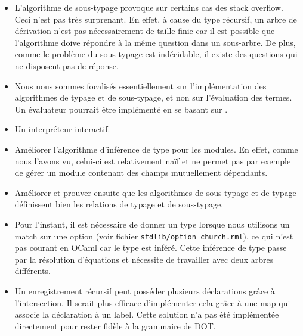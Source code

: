 \begin{itemize}
  \item L'algorithme de sous-typage provoque sur certains cas des stack
    overflow. Ceci n'est pas très surprenant. En effet, à cause
    du type récursif, un arbre de dérivation n'est pas nécessairement de taille finie car
    il est possible que l'algorithme doive répondre à la même question dans un
    sous-arbre. De plus, comme le problème du sous-typage est indécidable, il
    existe des questions qui ne disposent pas de réponse.
  \item Nous nous sommes focalisés essentiellement sur l'implémentation des
    algorithmes de typage et de sous-typage, et non sur l'évaluation des termes.
    Un évaluateur pourrait être implémenté en se basant sur \cite{WF-DOT-2016}.
  \item Un interpréteur interactif.
  \item Améliorer l'algorithme d'inférence de type pour les modules. En effet,
      comme nous l'avons vu, celui-ci est relativement naïf et ne permet pas par
      exemple de gérer un module contenant des champs mutuellement dépendants.
  \item Améliorer et prouver ensuite que les algorithmes de sous-typage et de
      typage définissent bien les relations de typage et de sous-typage.
  \item Pour l'instant, il est nécessaire de donner un type lorsque nous
    utilisons un match sur une option (voir fichier \verb|stdlib/option_church.rml|), ce qui
    n'est pas courant en OCaml car le type est inféré. Cette inférence de type
    passe par la résolution d'équations et nécessite de travailler avec deux
    arbres différents.
  \item Un enregistrement récursif peut posséder plusieurs déclarations grâce à
    l'intersection. Il serait plus efficace d'implémenter cela grâce à une map
    qui associe la déclaration à un label. Cette solution n'a pas été
    implémentée directement pour rester fidèle à la grammaire de DOT.
\end{itemize}

